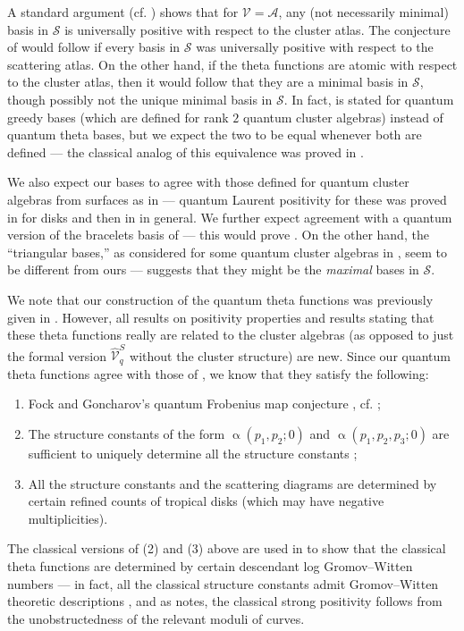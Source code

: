 \documentclass{amsart}
\let\s=\mathcal
\let\wh=\widehat
\renewcommand{\alpha}{\upalpha}
\theoremstyle{plain}%
\theoremstyle{definition}
\theoremstyle{remark}
\begin{document}
A standard argument (cf. \cite[\S 5]{LLRZpnas}) shows that for $\s{V}=\s{A}$, any (not necessarily minimal) basis in $\s{S}$ is universally positive with respect to the cluster atlas.  The conjecture of \cite{LLRZpnas} would follow if every basis in $\s{S}$ was universally positive with respect to the scattering atlas.  On the other hand, if the theta functions are atomic with respect to the cluster atlas, then it would follow that they are a minimal basis in $\s{S}$, though possibly not the unique minimal basis in $\s{S}$.  
In fact, \cite[Conj. 14]{LLRZpnas} is stated for quantum greedy bases (which are defined for rank $2$ quantum cluster algebras) instead of  quantum theta bases, but we expect the two to be equal whenever both are defined --- the classical analog of this equivalence was proved in \cite{CGMMRSW}.  

We also expect our bases to agree with those defined for quantum cluster algebras from surfaces as in \cite{AK} --- quantum Laurent positivity for these was proved in \cite[Thm 5.7]{Al} for disks and then in \cite[Thm. 1.1]{CKKO} in general.  We further expect agreement with a quantum version of the bracelets basis of \cite{MSW} --- this would prove \cite[Conj. 4.20]{Thurst}.   On the other hand, the ``triangular bases,'' as considered for some quantum cluster algebras in \cite{Qin}, seem to be different from ours --- \cite[Conj. 13]{LLRZpnas} suggests that they might be the \textit{maximal} bases in $\s{S}$.


We note that our construction of the quantum theta functions was previously given in \cite{Man3}.  However, all results on positivity properties and results stating that these theta functions really are related to the cluster algebras (as opposed to just the formal version $\wh{\s{V}}_q^S$ without the cluster structure) are new.  Since our quantum theta functions agree with those of \cite{Man3}, we know that they satisfy the following:
\begin{enumerate}
    \item Fock and Goncharov's quantum Frobenius map conjecture \cite[Conj. 4.8.6]{FG1}, cf. \cite[Thm. 4.3]{Man3};
    \item The structure constants of the form $\alpha(p_1,p_2;0)$ and $\alpha(p_1,p_2,p_3;0)$ are sufficient to uniquely determine all the structure constants \cite[Thm. 2.16]{Man3};
    \item All the structure constants and the scattering diagrams are determined by certain refined counts of tropical disks (which may have negative multiplicities).
\end{enumerate}
The classical versions of (2) and (3) above are used in \cite{ManFrob} to show that the classical theta functions are determined by certain descendant log Gromov--Witten numbers --- in fact, all the classical structure constants admit Gromov--Witten theoretic descriptions \cite{KY,GSInt2}, and as \cite{KY} notes, the classical strong positivity follows from the unobstructedness of the relevant moduli of curves.
\end{document}
